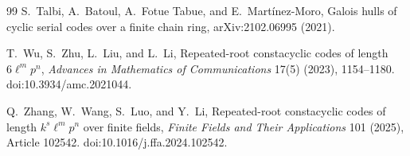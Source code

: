 \documentclass[11pt]{article}
\theoremstyle{definition}
\theoremstyle{remark}
\begin{document}
\begin{thebibliography}{99}
S.~Talbi, A.~Batoul, A.~Fotue Tabue, and E.~Mart\'inez-Moro,
Galois hulls of cyclic serial codes over a finite chain ring,
arXiv:2102.06995 (2021).

T.~Wu, S.~Zhu, L.~Liu, and L.~Li,
Repeated-root constacyclic codes of length \(6\ell^m p^n\),
\emph{Advances in Mathematics of Communications} 17(5) (2023),
1154--1180. doi:10.3934/amc.2021044.

Q.~Zhang, W.~Wang, S.~Luo, and Y.~Li,
Repeated-root constacyclic codes of length \(k^s\ell^m p^n\) over
finite fields,
\emph{Finite Fields and Their Applications} 101 (2025), Article 102542.
doi:10.1016/j.ffa.2024.102542.

\end{thebibliography}
\end{document}
